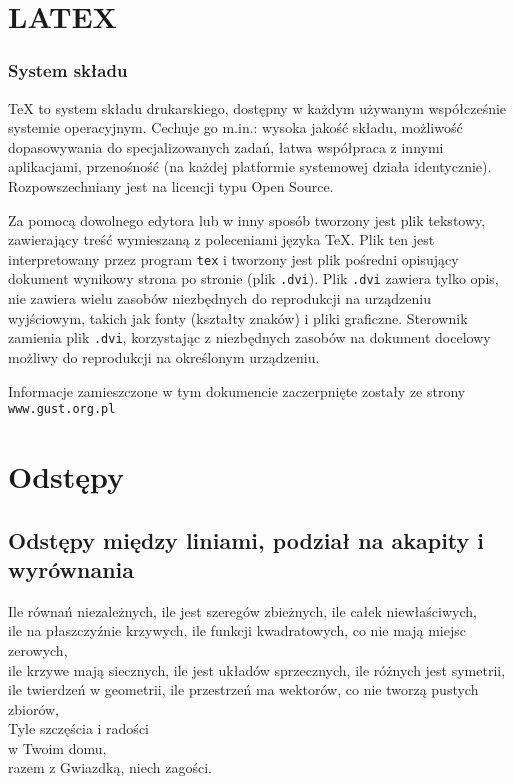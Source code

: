\documentclass[12pt]{article}
\begin{document}
\tableofcontents

\newpage

\section{LATEX}

\subsubsection{System składu}

\TeX{} to system składu drukarskiego, dostępny w każdym używanym współcześnie systemie operacyjnym. Cechuje go m.in.: wysoka jakość składu, możliwość dopasowywania do specjalizowanych zadań, łatwa współpraca z innymi aplikacjami, przenośność (na każdej platformie systemowej działa identycznie). Rozpowszechniany jest na licencji typu Open Source.

Za pomocą dowolnego edytora lub w inny sposób tworzony jest plik tekstowy, zawierający treść wymieszaną z poleceniami języka \TeX{}. Plik ten jest interpretowany przez program \texttt{tex} i tworzony jest plik pośredni opisujący dokument wynikowy strona po stronie (plik \texttt{.dvi}). Plik \texttt{.dvi} zawiera tylko opis, nie zawiera wielu zasobów niezbędnych do reprodukcji na urządzeniu wyjściowym, takich jak fonty (kształty znaków) i pliki graficzne. Sterownik zamienia plik \texttt{.dvi}, korzystając z niezbędnych zasobów na dokument docelowy możliwy do reprodukcji na określonym urządzeniu.

Informacje zamieszczone w tym dokumencie zaczerpnięte zostały ze strony \texttt{www.gust.org.pl}

\section{Odstępy}

\subsection{Odstępy między liniami, podział na akapity i wyrównania}

Ile równań niezależnych, ile jest szeregów zbieżnych, ile całek niewłaściwych,\\
ile na płaszczyźnie krzywych, ile funkcji kwadratowych, co nie mają miejsc zerowych,\\
ile krzywe mają siecznych, ile jest układów sprzecznych, ile różnych jest symetrii,\\
ile twierdzeń w geometrii, ile przestrzeń ma wektorów, co nie tworzą pustych zbiorów,\\
Tyle szczęścia i radości\\
w Twoim domu,\\
razem z Gwiazdką, niech zagości.
\end{document}
